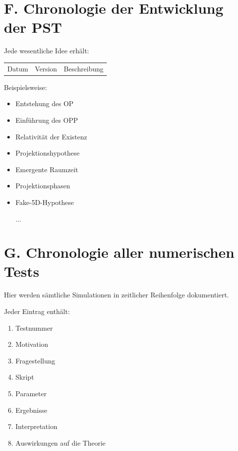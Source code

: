 \part{F. Chronologie der Entwicklung der PST}

Jede wesentliche Idee erhält:

\begin{tabular}{lll}

Datum

&
Version

&
Beschreibung

\end{tabular}

Beispielsweise:

\begin{itemize}

\item
Entstehung des OP

\item
Einführung des OPP

\item
Relativität der Existenz

\item
Projektionshypothese

\item
Emergente Raumzeit

\item
Projektionsphasen

\item
Fake-5D-Hypothese

...

\end{itemize}

\part{G. Chronologie aller numerischen Tests}

Hier werden sämtliche Simulationen in zeitlicher Reihenfolge dokumentiert.

Jeder Eintrag enthält:

\begin{enumerate}

\item
Testnummer

\item
Motivation

\item
Fragestellung

\item
Skript

\item
Parameter

\item
Ergebnisse

\item
Interpretation

\item
Auswirkungen auf die Theorie

\end{enumerate}

